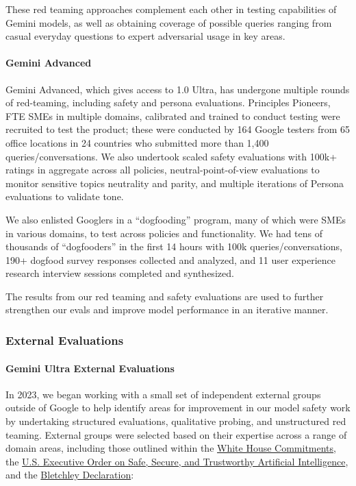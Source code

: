 These red teaming approaches complement each other in testing capabilities of Gemini models, as well as obtaining coverage of possible queries ranging from casual everyday questions to expert adversarial usage in key areas.

\paragraph{Gemini Advanced}

Gemini Advanced, which gives access to 1.0 Ultra, has undergone multiple rounds of red-teaming, including safety and persona evaluations. Principles Pioneers, FTE SMEs in multiple domains, calibrated and trained to conduct testing were recruited to test the product; these were conducted by 164 Google testers from 65 office locations in 24 countries who submitted more than 1,400 queries/conversations. We also undertook scaled safety evaluations with 100k+ ratings in aggregate across all policies, neutral-point-of-view evaluations to monitor sensitive topics neutrality and parity, and multiple iterations of Persona evaluations to validate tone. 

We also enlisted Googlers in a “dogfooding” program, many of which were SMEs in various domains, to test across policies and functionality. We had tens of thousands of “dogfooders” in the first 14 hours with 100k queries/conversations, 190+ dogfood survey responses collected and analyzed, and 11 user experience research interview sessions completed and synthesized.

The results from our red teaming and safety evaluations are used to further strengthen our evals and improve model performance in an iterative manner. 

\subsubsection{External Evaluations}

\paragraph{Gemini Ultra External Evaluations}

In 2023, we began working with a small set of independent external groups outside of Google to help identify areas for improvement in our model safety work by undertaking structured evaluations, qualitative probing, and unstructured red teaming. External groups were selected based on their expertise across a range of domain areas, including those outlined within the \href{https://www.whitehouse.gov/wp-content/uploads/2023/07/Ensuring-Safe-Secure-and-Trustworthy-AI.pdf}{White House Commitments}, the \href{https://www.whitehouse.gov/briefing-room/statements-releases/2023/10/30/fact-sheet-president-biden-issues-executive-order-on-safe-secure-and-trustworthy-artificial-intelligence/}{U.S. Executive Order on Safe, Secure, and Trustworthy Artificial Intelligence}, and the \href{https://www.gov.uk/government/publications/ai-safety-summit-2023-the-bletchley-declaration/the-bletchley-declaration-by-countries-attending-the-ai-safety-summit-1-2-november-2023}{Bletchley Declaration}: 

